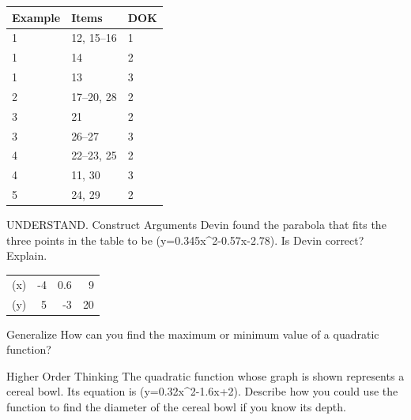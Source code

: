 \documentclass{article}
\newenvironment{item-analysis}{}{}      %
\newenvironment{practice}[2]{}{}        %
\newcommand{\answer}[1]{}               %
\newcommand{\placeholder}[2]{}          %
\begin{document}
\begin{item-analysis}
\begin{tabular}{lll}
\toprule
Example & Items & DOK \\
\midrule
1 & 12, 15--16 & 1 \\
1 & 14 & 2 \\
1 & 13 & 3 \\
2 & 17--20, 28 & 2 \\
3 & 21 & 2 \\
3 & 26--27 & 3 \\
4 & 22--23, 25 & 2 \\
4 & 11, 30 & 3 \\
5 & 24, 29 & 2 \\
\bottomrule
\end{tabular}
\end{item-analysis}
\begin{practice}{11}{3}
UNDERSTAND. Construct Arguments Devin found the parabola that fits the three points in the table to be (y=0.345x^2-0.57x-2.78). Is Devin correct? Explain.
\begin{tabular}{lrrr}
(x) & -4 & 0.6 & 9 \\
(y) & 5 & -3 & 20 \\
\end{tabular}
\answer{No; This is a fairly accurate model of the data, but it is not the exact model found when substituting the 3 points into the standard equation and solving for (a), (b), and (c).}
\end{practice}
\begin{practice}{12}{1}
Generalize How can you find the maximum or minimum value of a quadratic function?
\answer{Find the (y)-coordinate of the vertex.}
\end{practice}
\begin{practice}{13}{3}
Higher Order Thinking The quadratic function whose graph is shown represents a cereal bowl. Its equation is (y=0.32x^2-1.6x+2). Describe how you could use the function to find the diameter of the cereal bowl if you know its depth.
\placeholder{graph}{Red upward parabola (y=0.32x^2-1.6x+2), vertex (2.5,0), (y)-intercept 2, both ends arrowed. Black arrowed axes (x),(y), origin O, square grid spacing 2, window (x) from -8 to 12, (y) from -6 to 14. (x) labels -4,4,8; (y) labels -4,4,8,12.}
\answer{First find the vertex. Since the vertex is on the (x)-axis, the top of the bowl can be represented by a horizontal line with (y) equal to the bowl's depth. You can calculate the diameter by setting (y) equal to the depth and solving for (x), then finding the difference between the two solutions.}
\end{practice}
\end{document}
